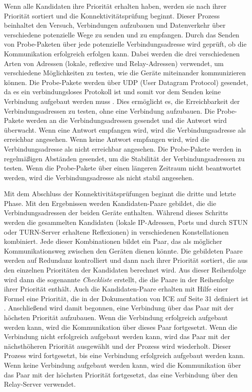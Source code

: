 Wenn alle Kandidaten ihre Priorität erhalten haben, werden sie nach ihrer Priorität sortiert und die Konnektivitätsprüfung beginnt. Dieser Prozess beinhaltet den Versuch, Verbindungen aufzubauen und Datenverkehr über verschiedene potenzielle Wege zu senden und zu empfangen.
Durch das Senden von Probe-Paketen über jede potenzielle Verbindungsadresse wird geprüft, ob die Kommunikation erfolgreich erfolgen kann. Dabei werden die drei verschiedenen Arten von Adressen (lokale, reflexive und Relay-Adressen) verwendet, um verschiedene Möglichkeiten zu testen, wie die Geräte miteinander kommunizieren können. Die Probe-Pakete werden über UDP (User Datagram Protocol) gesendet, da es ein verbindungsloses Protokoll ist und somit vor dem Senden keine Verbindung aufgebaut werden muss \parencite[S. 1]{rfc768_UDP}. Dies ermöglicht es, die Erreichbarkeit der Verbindungsadressen zu testen, ohne eine Verbindung aufzubauen. Die Probe-Pakete werden an die Verbindungsadressen gesendet und die Antwort wird überwacht. Wenn eine Antwort empfangen wird, wird die Verbindungsadresse als erreichbar angesehen. Wenn keine Antwort empfangen wird, wird die Verbindungsadresse als nicht erreichbar angesehen. Die Probe-Pakete werden in regelmäßigen Abständen gesendet, um die Stabilität der Verbindungsadressen zu testen. Wenn die Probe-Pakete über einen längeren Zeitraum nicht beantwortet werden, wird die Verbindungsadresse als nicht stabil angesehen. 

Mit dem Abschluss der Konnektivitätsprüfungen beginnt die dritte und letzte Phase. Mit den Ergebnissen werden Kandidaten-Paare gebildet, die die Verbindungsadressen der beiden Geräte enthalten. Während dieses Schritts werden die gesammelten Kandidaten (lokale IP-Adressen, Ports und durch STUN oder TURN-Server erhaltene Reflexionen) in verschiedenen Konstellationen kombiniert. Jede dieser Kombinationen bildet ein Paar, das als möglicher Kommunikationsweg zwischen den Geräten dienen könnte. Die gebildeten Paare werden auf Redundanz kontrolliert und dann nach ihrer Priorität sortiert, die aus den einzelnen Prioritäten der Kandidaten berechnet wird. Aus dieser Reihenfolge wird dann die sogenannte \textit{Checkliste} erstellt, die die Paare in der Reihenfolge ihrer Priorität enthält. Auch die Kandidaten-Paare erhalten mit Hilfe einer Formel eine Priorität, die in der Dokumentation von ICE auf Seite 31 definiert ist \parencite[S. 31]{rfc8445_ICE}. Anschließend  wird damit begonnen, eine Verbindung über das Paar mit der höchsten Priorität aufzubauen. Wenn die Verbindung erfolgreich aufgebaut werden kann, wird die Kommunikation über dieses Paar fortgesetzt. Wenn die Verbindung nicht erfolgreich aufgebaut werden kann, wird das Paar mit der nächsthöheren Priorität ausgewählt und der Prozess wird wiederholt. Dieser Prozess wird fortgesetzt, bis eine Verbindung erfolgreich aufgebaut werden kann. Wenn keine Verbindung aufgebaut werden kann, wird die Kommunikation über das Paar mit der höchsten Priorität fortgesetzt, das eine Verbindung über den Relay-Server verwendet.

